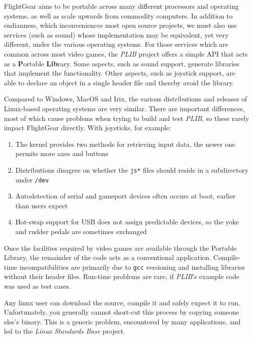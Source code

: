 \documentclass[a4paper,10pt]{article}
\begin{document}
FlightGear aims to be portable across many different processors and
operating systems, as well as scale upwards from commodity computers.
In addition to endianness, which inconveniences most open source projects,
we must also use services (such as sound) whose implementation may be
equivalent, yet very different, under the various operating systems.
For those services which are common across most video games, the
\textsl{PLIB} project offers a simple API that acts as a
\textbf{P}ortable \textbf{Lib}rary\cite{plib}.
Some aspects, such as sound support, generate libraries that implement
the functionality.  Other aspects, such as joystick support, are able
to declare an object in a single header file and thereby avoid the library.

Compared to Windows, MacOS and Irix, the various distributions and releases
of Linux-based operating systems are very similar.  There are important
differences, most of which cause problems when trying to build and test
\textsl{PLIB}, so these rarely impact FlightGear directly.
With joysticks, for
example:
\begin{enumerate}
\item The kernel provides two methods for retrieving input data,
the newer one permits more axes and buttons
\item Distributions disagree on whether the {\tt js*} files
should reside in a subdirectory under {\tt /dev}
\item Autodetection of serial and gameport devices often occurs at boot,
earlier than users expect
\item Hot-swap support for USB does not assign predictable devices,
so the yoke and rudder pedals are sometimes exchanged
\end{enumerate}

%
Once the facilities required by video games are available through
the Portable Library, the remainder of the code acts as a conventional
application.  Compile-time incompatibilities are primarily due to
{\tt gcc} versioning and installing libraries without their header files.
Run-time problems are rare,
if \textsl{PLIB}'s example code was used as test cases.

Any linux user can download the source, compile it and
safely expect it to run.
Unfortunately, you generally cannot short-cut
this process by copying someone else's binary.
This is a generic problem, encountered by many applications,
and led to the \textsl{Linux Standards Base} project\cite{lsb}.
\end{document}
